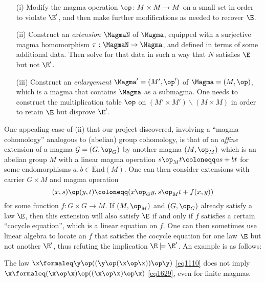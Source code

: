 \begin{itemize}
  \item[(i)]  Modify the magma operation $\op \colon M \times M \to M$ on a small set in order to violate ${\E'}$, and then make further modifications as needed to recover $\E$.
  \item[(ii)]  Construct an \emph{extension} $\MagmaN$ of $\Magma$, equipped with a surjective magma homomorphism $\pi: \MagmaN \to \Magma$, and defined in terms of some additional data.  Then solve for that data in such a way that $N$ satisfies $\E$ but not ${\E'}$.
  \item[(iii)]  Construct an \emph{enlargement} $\Magma' = (M',\op')$ of $\Magma = (M,\op)$, which is a magma that contains $\Magma$ as a submagma.  One needs to construct the multiplication table $\op$ on $(M' \times M') \backslash (M \times M)$ in order to retain $\E$ but disprove ${\E'}$.
\end{itemize}

One appealing case of (ii) that our project discovered, involving a ``magma cohomology'' analogous to (abelian) group cohomology, is that of an \emph{affine} extension of a magma ${\mathcal G} = (G,\op_G)$ by another magma $(M,\op_M)$ which is an abelian group $M$ with a linear magma operation $s \op_M t \coloneqq as + bt$ for some endomorphisms $a,b \in \mathrm{End}(M)$.  One can then consider extensions with carrier $G \times M$ and magma operation
\begin{equation}\label{xsyt}
 (x, s) \op (y, t) \coloneqq (x \op_G y, s \op_M t + f(x,y))
\end{equation}
for some function $f \colon G \times G \to M$.  If $(M,\op_M)$ and $(G,\op_G)$ already satisfy a law $\E$, then this extension will also satisfy $\E$ if and only if $f$ satisfies a certain ``cocycle equation'', which is a linear equation on $f$.  One can then sometimes use linear algebra to locate an $f$ that satisfies the cocycle equation for one law $\E$ but not another ${\E'}$, thus refuting the implication $\E \models {\E'}$.  An example is as follows:

\begin{proposition}\label{1110-1629} The law $\x \formaleq \y \op ((\y \op (\x \op \x)) \op \y)$ \eqref{eq1110} does not imply $\x \formaleq (\x \op \x) \op ((\x \op \x) \op \x)$ \eqref{eq1629}, even for finite magmas.
\end{proposition}


